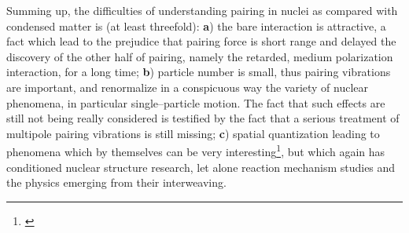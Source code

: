 \begin{subappendices}
    Summing up, the difficulties of understanding pairing in nuclei as compared with condensed matter is (at least threefold): \textbf{a}) the bare interaction is attractive, a fact which lead to the prejudice that pairing force is short range and delayed the discovery of the other half of pairing, namely the retarded, medium polarization interaction, for a long time; \textbf{b}) particle number is small, thus pairing vibrations are important, and renormalize in a conspicuous way the variety of nuclear phenomena, in particular single--particle motion. The fact that such effects are still not being really considered is testified by the fact that a serious treatment of multipole pairing vibrations is still missing; \textbf{c}) spatial quantization leading to phenomena which by themselves can be very interesting\footnote{\cite{Bertsch:67,Ferreira:84,Lotti:89,Matsuo:06,Matsuo:13}}, but which again has conditioned nuclear structure research, let alone reaction mechanism studies and the physics emerging from their interweaving.

\end{subappendices}
